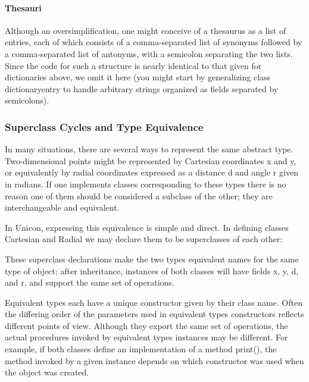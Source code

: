 \paragraph{Thesauri}
Although an oversimplification, one might conceive of a thesaurus as a
list of entries, each of which consists of a comma-separated list of
synonyms followed by a comma-separated list of antonyms, with a
semicolon separating the two lists. Since the code for such a structure
is nearly identical to that given for dictionaries above, we omit it
here (you might start by generalizing class \textsf{dictionaryentry} to
handle arbitrary strings organized as fields separated by semicolons). 

\subsubsection{Superclass Cycles and Type Equivalence}

In many situations, there are several ways to represent the same
abstract type. Two-dimensional points might be represented by
Cartesian coordinates x and y, or
equivalently by radial coordinates expressed as a distance d and angle
r given in radians. If one implements classes
corresponding to these types there is no reason one of them should be
considered a subclass of the other; they are interchangeable and
equivalent. 

In Unicon, expressing this equivalence is simple and direct. In defining
classes \textsf{Cartesian} and \textsf{Radial} we may declare them to
be superclasses of each other: 


These superclass declarations make the two types equivalent names for
the same type of object; after inheritance,
instances of both classes will
have fields x, y, d, and r, and support the same set of operations. 

Equivalent types each have a unique constructor
given by their class name. Often the differing order of the parameters
used in equivalent types{\textquotesingle} constructors reflects
different points of view. Although they export the same set of
operations, the actual procedures invoked by equivalent
types{\textquotesingle} instances may be different. For example, if
both classes define an implementation of a method \textsf{print()}, the
method invoked by a given instance depends on which constructor was
used when the object was created.

